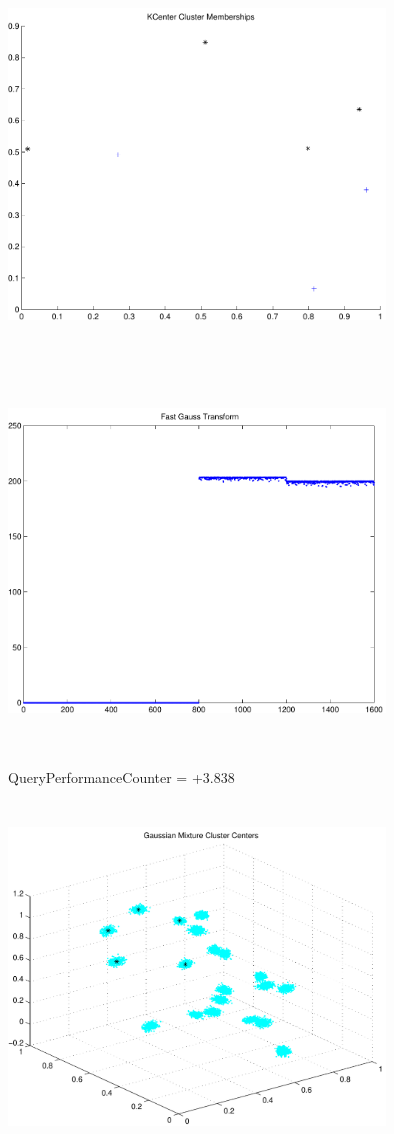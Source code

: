 \documentclass[9pt]{article}
\theoremstyle{plain}
\theoremstyle{definition}
\theoremstyle{remark}
\numberwithin{equation}{section}
\begin{document}
\includegraphics[width=10.0cm,height=10.0cm]{KCenterClusterMemberships_4_Centers.pdf}

\includegraphics[width=10.0cm,height=10.0cm]{FGT4_Centers.pdf}

QueryPerformanceCounter  =  +3.838
\includegraphics[width=10.0cm,height=10.0cm]{GaussianMixture_ClusterCenters20_Centers.pdf}
\end{document}
